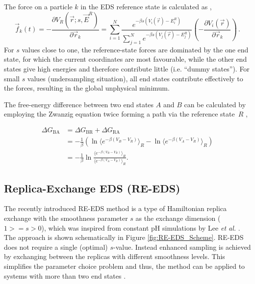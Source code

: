 The force on a particle $k$ in the EDS reference state is calculated as \cite{Christ2008},
\begin{equation}
    \vec{f}_k(t)=-\frac{\partial V_R(\vec{r}; s, \vec{E}^R)}{\partial \vec{r}_k} = \sum^N_{i=1}\frac{e^{-\beta s(V_i(\vec{r}) -E_i^R)}}{\sum^N_{j=1}{e^{-\beta s (V_j(\vec{r})-E_j^R)}}}  \left( -\frac{\partial V_i(\vec{r})}{\partial \vec{r}_k} \right) \,.
    \label{eq:laws_of_motion}
\end{equation}
%
For $s$ values close to one, the reference-state forces are dominated by the one end state, for which the current coordinates are most favourable, while the other end states give high energies and therefore contribute little (i.e. ``dummy states'').  
For small $s$ values (undersampling situation), all end states contribute effectively to the forces, resulting in the global unphysical minimum.

The free-energy difference between two end states $A$ and $B$ can be calculated by employing the Zwanzig equation twice forming a path via the reference state~$R$ \cite{Zwanzig1954,Christ2007,Christ2008},

\begin{align} \nonumber
    \Delta G_{\text{BA}} &=  \Delta G_{\text{BR}} + \Delta G_{\text{RA}} \\ 
    &=-\frac{1}{\beta}\left(\ln \langle e^{-\beta (V_B-V_R)}\rangle_R - \ln \langle e^{-\beta (V_A-V_R )}\rangle_R\right) \\ 
    &= -\frac{1}{\beta} \ln \frac{\langle e^{-\beta (V_B-V_R)}\rangle_R}{\langle e^{-\beta (V_A-V_R)}\rangle_R}.
    \label{EQ: Free Energy calculation via reference state}
 \end{align}


\subsection{Replica-Exchange EDS (RE-EDS)}
The recently introduced RE-EDS method \cite{Sidler2016,Sidler2017} is a type of Hamiltonian replica exchange \cite{Hansmann1997,Sugita2000} with the smoothness parameter $s$ as the exchange dimension ($1>=s>0$), which was inspired from constant pH simulations by Lee \textit{et al.} \cite{Lee2014,Lee2015}. The approach is shown schematically in Figure \ref{fig:RE-EDS_Scheme}.
RE-EDS does not require a single (optimal) $s$-value. Instead enhanced sampling is achieved by exchanging between the replicas with different smoothness levels. This simplifies the parameter choice problem and thus, the method can be applied to systems with more than two end states \cite{Sidler2016,Sidler2017}.

